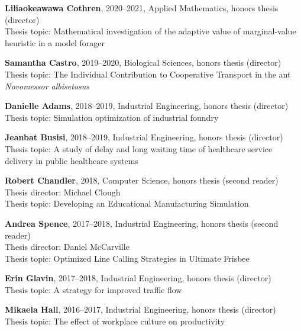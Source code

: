 \documentclass[10pt]{article}
\begin{document}
\begin{outerlist}
    \item \textbf{Liliaokeawawa Cothren}, 2020--2021, Applied Mathematics, honors thesis (director)\\
        Thesis topic: Mathematical investigation of the adaptive value of marginal-value heuristic in a model forager

    \item \textbf{Samantha Castro}, 2019--2020, Biological Sciences, honors thesis (director)\\
        Thesis topic: The Individual Contribution to Cooperative Transport in the ant \emph{Novomessor albisetosus}

    \item \textbf{Danielle Adams}, 2018--2019, Industrial Engineering, honors thesis (director)\\
        Thesis topic: Simulation optimization of industrial foundry

    \item \textbf{Jeanbat Busisi}, 2018--2019, Industrial Engineering, honors thesis (director)\\
        Thesis topic: A study of delay and long waiting time of healthcare service delivery in public healthcare systems

    \item \textbf{Robert Chandler}, 2018, Computer Science, honors thesis (second reader)
        Thesis director: Michael Clough\\
        Thesis topic: Developing an Educational Manufacturing Simulation

    \item \textbf{Andrea Spence}, 2017--2018, Industrial Engineering, honors thesis (second reader)\\
        Thesis director: Daniel McCarville\\
        Thesis topic: Optimized Line Calling Strategies in Ultimate Frisbee

    \item \textbf{Erin Glavin}, 2017--2018, Industrial Engineering, honors thesis (director)\\
        Thesis topic: A strategy for improved traffic flow

    \item \textbf{Mikaela Hall}, 2016--2017, Industrial Engineering, honors thesis (director)\\
        Thesis topic: The effect of workplace culture on productivity


\end{outerlist}
\end{document}
